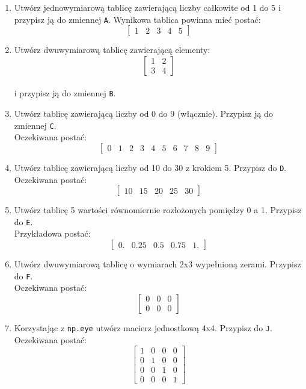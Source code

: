 \documentclass[
  letterpaper,
  DIV=11,
  numbers=noendperiod]{scrreprt}
\begin{document}
\begin{enumerate}
\def\labelenumi{\arabic{enumi}.}
\item
  Utwórz jednowymiarową tablicę zawierającą liczby całkowite od 1 do 5 i
  przypisz ją do zmiennej \texttt{A}. Wynikowa tablica powinna mieć
  postać: \[\begin{bmatrix}1 & 2 & 3 & 4 & 5\end{bmatrix} \]
\item
  Utwórz dwuwymiarową tablicę zawierającą elementy:
  \[\begin{bmatrix}1 & 2 \\ 3 & 4\end{bmatrix} \]\\
  i przypisz ją do zmiennej \texttt{B}.
\item
  Utwórz tablicę zawierającą liczby od 0 do 9 (włącznie). Przypisz ją do
  zmiennej \texttt{C}.\\
  Oczekiwana postać:
  \[\begin{bmatrix}0 & 1 & 2 & 3 & 4 & 5 & 6 & 7 & 8 & 9\end{bmatrix} \]
\item
  Utwórz tablicę zawierającą liczby od 10 do 30 z krokiem 5. Przypisz do
  \texttt{D}.\\
  Oczekiwana postać:
  \[\begin{bmatrix}10 & 15 & 20 & 25 & 30\end{bmatrix} \]
\item
  Utwórz tablicę 5 wartości równomiernie rozłożonych pomiędzy 0 a 1.
  Przypisz do \texttt{E}.\\
  Przykładowa postać:
  \[\begin{bmatrix}0. & 0.25 & 0.5 & 0.75 & 1.\end{bmatrix} \]
\item
  Utwórz dwuwymiarową tablicę o wymiarach 2x3 wypełnioną zerami.
  Przypisz do \texttt{F}.\\
  Oczekiwana postać:
  \[\begin{bmatrix}0 & 0 & 0 \\ 0 & 0 & 0\end{bmatrix} \]
\item
  Korzystając z \texttt{np.eye} utwórz macierz jednostkową 4x4. Przypisz
  do \texttt{J}.\\
  Oczekiwana postać:
  \[\begin{bmatrix}1 & 0 & 0 & 0 \\ 0 & 1 & 0 & 0 \\ 0 & 0 & 1 & 0 \\ 0 & 0 & 0 & 1\end{bmatrix} \]
\end{enumerate}
\end{document}

